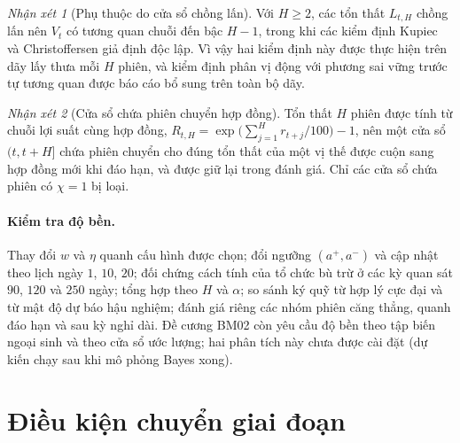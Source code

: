 \documentclass[12pt,a4paper]{article}
\theoremstyle{definition}
\theoremstyle{remark}
\newtheorem{nhanxet}{Nhận xét}[section]
\begin{document}
\begin{nhanxet}[Phụ thuộc do cửa sổ chồng lấn]
Với $H\ge2$, các tổn thất $L_{t,H}$ chồng lấn nên $V_t$ có tương quan chuỗi đến bậc $H-1$, trong khi các kiểm định Kupiec và Christoffersen giả định độc lập. Vì vậy hai kiểm định này được thực hiện trên dãy lấy thưa mỗi $H$ phiên, và kiểm định phân vị động với phương sai vững trước tự tương quan được báo cáo bổ sung trên toàn bộ dãy.
\end{nhanxet}

\begin{nhanxet}[Cửa sổ chứa phiên chuyển hợp đồng]
Tổn thất $H$ phiên được tính từ chuỗi lợi suất cùng hợp đồng, $R_{t,H}=\exp\big(\sum_{j=1}^{H}r_{t+j}/100\big)-1$, nên một cửa sổ $(t,t+H]$ chứa phiên chuyển cho đúng tổn thất của một vị thế được cuộn sang hợp đồng mới khi đáo hạn, và được giữ lại trong đánh giá. Chỉ các cửa sổ chứa phiên có $\chi=1$ bị loại.
\end{nhanxet}

\paragraph{Kiểm tra độ bền.} Thay đổi $w$ và $\eta$ quanh cấu hình được chọn; đổi ngưỡng $(a^{+},a^{-})$ và cập nhật theo lịch ngày $1$, $10$, $20$; đối chứng cách tính của tổ chức bù trừ ở các kỳ quan sát $90$, $120$ và $250$ ngày; tổng hợp theo $H$ và $\alpha$; so sánh ký quỹ từ hợp lý cực đại và từ mật độ dự báo hậu nghiệm; đánh giá riêng các nhóm phiên căng thẳng, quanh đáo hạn và sau kỳ nghỉ dài. Đề cương BM02 còn yêu cầu độ bền theo tập biến ngoại sinh và theo cửa sổ ước lượng; hai phân tích này chưa được cài đặt (dự kiến chạy sau khi mô phỏng Bayes xong).

\section{Điều kiện chuyển giai đoạn}\label{sec:cong}
\end{document}
